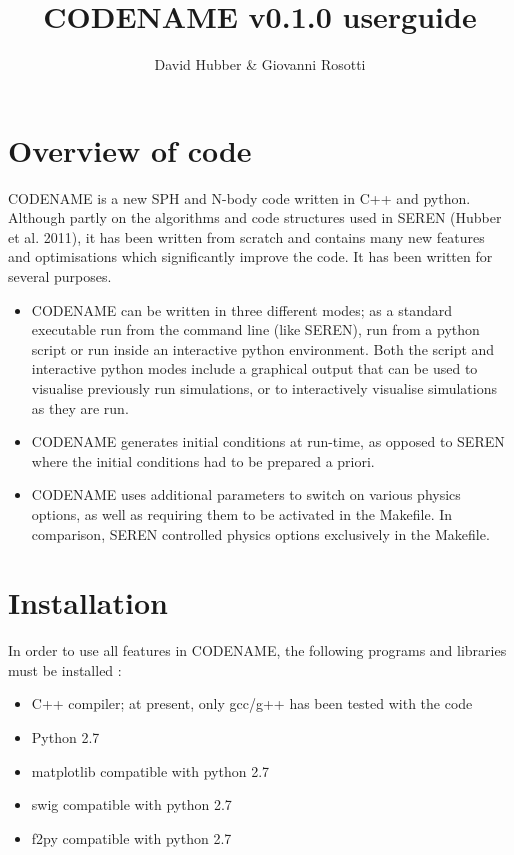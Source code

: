 \documentclass[a4paper]{article}
\newcommand{\VERNO}{0.1.0 }
\begin{document}
\title{CODENAME v\VERNO userguide}
\author{David Hubber \& Giovanni Rosotti}

\maketitle
\tableofcontents

\newpage


\section{Overview of code}
CODENAME is a new SPH and N-body code written in C++ and python.  Although partly on the algorithms and code structures used in SEREN (Hubber et al. 2011), it has been written from scratch and contains many new features and optimisations which significantly improve the code.  It has been written for several purposes.
\begin{itemize}
\item CODENAME can be written in three different modes; as a standard executable run from the command line (like SEREN), run from a python script or run inside an interactive python environment.  Both the script and interactive python modes include a graphical output that can be used to visualise previously run simulations, or to interactively visualise simulations as they are run.
\item CODENAME generates initial conditions at run-time, as opposed to SEREN where the initial conditions had to be prepared a priori.
\item CODENAME uses additional parameters to switch on various physics options, as well as requiring them to be activated in the Makefile.  In comparison, SEREN controlled physics options exclusively in the Makefile.
\end{itemize}


\section{Installation} \label{S:INSTALL}
In order to use all features in CODENAME, the following programs and libraries must be installed : 
\begin{itemize}
\item C++ compiler; at present, only gcc/g++ has been tested with the code
\item Python 2.7
\item matplotlib compatible with python 2.7
\item swig compatible with python 2.7
\item f2py compatible with python 2.7
\end{itemize}
\end{document}
